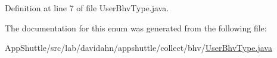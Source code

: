 \-Definition at line 7 of file \-User\-Bhv\-Type.\-java.



\-The documentation for this enum was generated from the following file\-:\begin{DoxyCompactItemize}
\item 
\-App\-Shuttle/src/lab/davidahn/appshuttle/collect/bhv/\hyperlink{_user_bhv_type_8java}{\-User\-Bhv\-Type.\-java}\end{DoxyCompactItemize}
